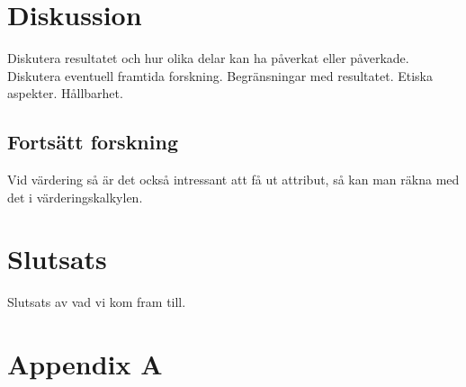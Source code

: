 \documentclass{kththesis}
\begin{document}
\chapter{Diskussion}
Diskutera resultatet och hur olika delar kan ha påverkat eller påverkade. Diskutera eventuell framtida forskning. Begränsningar med resultatet.
Etiska aspekter. Hållbarhet. 

  \section{Fortsätt forskning}
  Vid värdering så är det också intressant att få ut attribut, så kan man räkna med det i värderingskalkylen.

\chapter{Slutsats}  
Slutsats av vad vi kom fram till.

\printbibliography[heading=bibintoc]
\appendix
  \chapter{Appendix A}

\tailmatter
\end{document}
